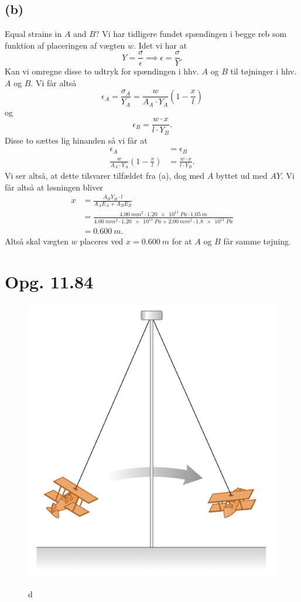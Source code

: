 \documentclass[12pt]{article}
\theoremstyle{definition}
\begin{document}
\subsection*{(b)}
Equal strains in $A$ and $B$?
\bigbreak
Vi har tidligere fundet spændingen i begge reb som funktion af placeringen af vægten $w$. Idet vi har at
\[ 
Y = \frac{\sigma}{\epsilon} \implies \epsilon = \frac{\sigma}{Y}
.\]
Kan vi omregne disse to udtryk for spændingen i hhv. $A$ og $B$ til tøjninger i hhv. $A$ og $B$. Vi får altså
\[ 
  \epsilon_A = \frac{\sigma_A}{Y_A} = \frac{w}{A_A \cdot Y_A}\left( 1 - \frac{x}{l} \right)
\]
og
\[ 
  \epsilon_B = \frac{w\cdot x}{l \cdot Y_B}
.\]
Disse to sættes lig hinanden så vi får at
\begin{align*}
  \epsilon_A &= \epsilon_B \\
  \frac{w}{A_A \cdot Y_A} \left( 1 - \frac{x}{l} \right) &= \frac{w\cdot x}{l \cdot Y_B}
.\end{align*}
Vi ser altså, at dette tilsvarer tilfældet fra (a), dog med $A$ byttet ud med $AY$. Vi får altså at løsningen bliver
\begin{align*}
  x &= \frac{A_BY_B \cdot l}{A_AE_A + A_BE_B} \\
  &= \frac{\qty{4,00}{mm^2} \cdot \qty{1,20e11}{Pa} \cdot \qty{1,05}{m}}{\qty{4,00}{mm^2} \cdot \qty{1,20e11}{Pa} + \qty{2,00}{mm^2} \cdot \qty{1,8e11}{Pa}} \\
  &= \qty{0,600}{m} 
.\end{align*}
Altså skal vægten $w$ placeres ved $x = \qty{0,600}{m}$ for at $A$ og $B$ får samme tøjning.


\section*{Opg. 11.84}
\begin{figure} [ht]
  \centering
  \caption{d}
  \includegraphics[width=0.5\linewidth]{../figures/P11_84.png}
  \label{fig:P11_84}
\end{figure}
\end{document}
